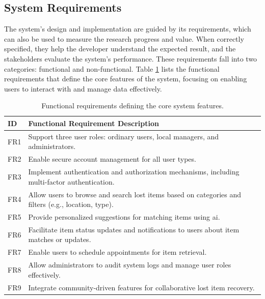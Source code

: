 
\subsection{System Requirements} \label{section:requirements}

The system's design and implementation are guided by its requirements, which can also be used to measure the research progress and value. When correctly specified, they help the developer understand the expected result, and the stakeholders evaluate the system's performance. These requirements fall into two categories: functional and non-functional. Table \ref{tab:functional_requirements} lists the functional requirements that define the core features of the system, focusing on enabling users to interact with and manage data effectively.

\begin{table}[!htb]
\centering
\begin{tabular}{|p{}|p{}|}
\hline
\textbf{ID} & \textbf{Functional Requirement Description} \\ \hline
FR1 & Support three user roles: ordinary users, local managers, and administrators. \\ \hline
FR2 & Enable secure account management for all user types. \\ \hline
FR3 & Implement authentication and authorization mechanisms, including multi-factor authentication. \\ \hline
FR4 & Allow users to browse and search lost items based on categories and filters (e.g., location, type). \\ \hline
FR5 & Provide personalized suggestions for matching items using \ac{ai}. \\ \hline
FR6 & Facilitate item status updates and notifications to users about item matches or updates. \\ \hline
FR7 & Enable users to schedule appointments for item retrieval. \\ \hline
FR8 & Allow administrators to audit system logs and manage user roles effectively. \\ \hline
FR9 & Integrate community-driven features for collaborative lost item recovery. \\ \hline
\end{tabular}
\caption[Functional Requirements]{Functional requirements defining the core system features.}
\label{tab:functional_requirements}
\end{table}

